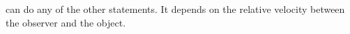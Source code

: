 can do any of the other statements. 
It depends on the relative velocity between the observer and the object.